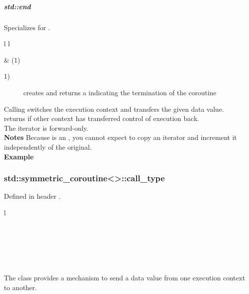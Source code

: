 \subparagraph*{std::end}
Specializes  for \pushcoro.\\

\begin{tabular}{ l l }
    \midrule

     & (1)\\

    \midrule
\end{tabular}

\begin{description}
    \item[1)] creates and returns a  indicating the termination of the coroutine\\
\end{description}

Calling  switches the execution context and transfers the given data value.\\
 returns if other context has transferred control of execution back.\\
The iterator is forward-only.\\

{\bf Notes}
\newline
Because \pushcoroiterator is an , you cannot expect to
copy an iterator and increment it independently of the original.\\

{\bf Example}


\subsubsection*{std::symmetric\_coroutine<>::call\_type}
Defined in header .\\
\begin{tabular}{ l }
    \midrule

    \\

    \midrule

    \\

    \midrule

    \\

    \midrule
\end{tabular}
\newline
The class \callcoro provides a mechanism to send a data value from one
execution context to another.\\

